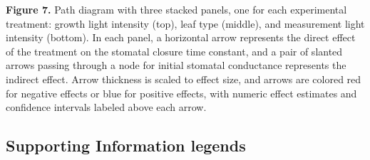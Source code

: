 \documentclass[
  letterpaper,
  DIV=11,
  numbers=noendperiod]{scrartcl}
\begin{document}
\textbf{Figure 7.} Path diagram with three stacked panels, one for each
experimental treatment: growth light intensity (top), leaf type
(middle), and measurement light intensity (bottom). In each panel, a
horizontal arrow represents the direct effect of the treatment on the
stomatal closure time constant, and a pair of slanted arrows passing
through a node for initial stomatal conductance represents the indirect
effect. Arrow thickness is scaled to effect size, and arrows are colored
red for negative effects or blue for positive effects, with numeric
effect estimates and confidence intervals labeled above each arrow.

\newpage{}

\subsection{Supporting Information
legends}\label{supporting-information-legends}
\end{document}
